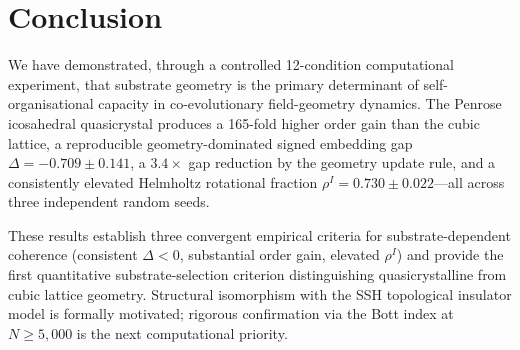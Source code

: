 \documentclass[11pt,a4paper]{article}
\begin{document}
\begin{table}[htbp]
\centering
{}
\caption{GPU compute roadmap. All items feasible within a single NVIDIA Innovation Lab DGX Cloud allocation.}
\end{table}

\section{Conclusion}

We have demonstrated, through a controlled 12-condition computational experiment, that substrate geometry is the primary determinant of self-organisational capacity in co-evolutionary field-geometry dynamics. The Penrose icosahedral quasicrystal produces a 165-fold higher order gain than the cubic lattice, a reproducible geometry-dominated signed embedding gap $\Delta = -0.709 \pm 0.141$, a $3.4\times$ gap reduction by the geometry update rule, and a consistently elevated Helmholtz rotational fraction $\rho^I = 0.730 \pm 0.022$---all across three independent random seeds.

These results establish three convergent empirical criteria for substrate-dependent coherence (consistent $\Delta < 0$, substantial order gain, elevated $\rho^I$) and provide the first quantitative substrate-selection criterion distinguishing quasicrystalline from cubic lattice geometry. Structural isomorphism with the SSH topological insulator model is formally motivated; rigorous confirmation via the Bott index at $N \geq 5{,}000$ is the next computational priority.
\end{document}
